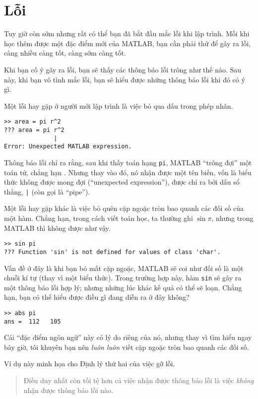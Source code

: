\documentclass[12pt]{book}
\begin{document}
\section{Lỗi}

Tuy giờ còn sớm nhưng rất có thể bạn đã bắt đầu mắc lỗi khi lập trình.
Mỗi khi học thêm được một đặc điểm mới của MATLAB, bạn cần phải
thử để gây ra lỗi, càng nhiều càng tốt, càng sớm càng tốt.

Khi bạn cố ý gây ra lỗi, bạn sẽ thấy các thông báo lỗi trông như thế nào.
Sau này, khi bạn vô tình mắc lỗi, bạn sẽ hiểu được những thông báo lỗi
khi đó có ý gì.

Một lỗi hay gặp ở người mới lập trình là việc bỏ qua dấu {\tt *} trong
phép nhân.

\begin{verbatim}
>> area = pi r^2
??? area = pi r^2
              |
Error: Unexpected MATLAB expression.
\end{verbatim}
%
Thông báo lỗi chỉ ra rằng, sau khi thấy toán hạng {\tt pi},
MATLAB ``trông đợi'' một toán tử, chẳng hạn {\tt *}.  Nhưng thay vào đó,
nó nhận được một tên biến, vốn là biểu thức không được mong đợi 
(``unexpected expression''), được chỉ ra bởi dấu sổ thẳng, {\tt |} 
(còn gọi là ``pipe'').

Một lỗi hay gặp khác là việc bỏ quên cặp ngoặc tròn bao quanh các
đối số của một hàm. Chẳng hạn, trong cách viết toán học, ta thường 
ghi $\sin \pi$, nhưng trong MATLAB thì không được như vậy.

\begin{verbatim}
>> sin pi
??? Function 'sin' is not defined for values of class 'char'.
\end{verbatim}

Vấn đề ở đây là khi bạn bỏ mất cặp ngoặc, MATLAB sẽ coi như 
đối số là một chuỗi kí tự (thay vì một biểu thức). Trong trường hợp này,
hàm {\tt sin} sẽ gây ra một thông báo lỗi hợp lý; nhưng những lúc khác
kế quả có thể sẽ loạn. Chẳng hạn, bạn có thể hiểu được điều gì 
đang diễn ra ở đây không?

\begin{verbatim}
>> abs pi
ans =  112   105
\end{verbatim}
%
Cái ``đặc điểm ngôn ngữ'' này có lý do riêng của nó, nhưng thay vì tìm
hiểu ngay bây giờ, tôi khuyên bạn nên {\em luôn luôn} viết cặp ngoặc
tròn bao quanh các đối số.

Ví dụ này minh họa cho Định lý thứ hai của việc gỡ lỗi.

\begin{quote}
Điều duy nhất còn tồi tệ hơn cả việc nhận được thông báo lỗi là việc 
{\em không} nhận được thông báo lỗi nào.
\end{quote}
\end{document}
